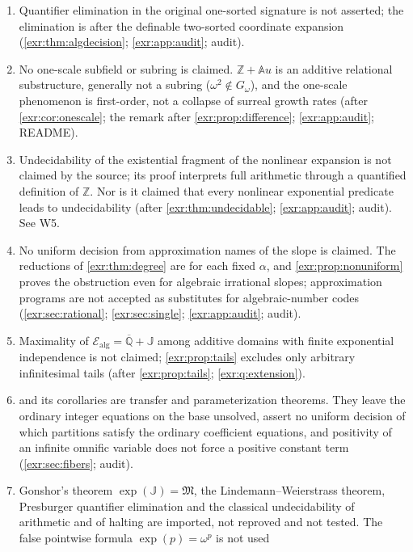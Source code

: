 \documentclass[11pt,letterpaper]{article}
\numberwithin{equation}{section}
\theoremstyle{definition}
\theoremstyle{remark}
\newcommand{\Z}{\mathbb Z}
\newcommand{\A}{\mathbb A}
\newcommand{\Qb}{\overline{\mathbb Q}}
\newcommand{\J}{\mathbb J}
\newcommand{\M}{\mathfrak M}
\newcommand{\Ealg}{\mathcal E_{\mathrm{alg}}}
\begin{document}
\begin{enumerate}[label=S\arabic*.,leftmargin=2.6em,itemsep=2pt]
omnific terms only, and rational slopes do not make division a total function
(after \cref{exr:thm:rational}; \cref{exr:sec:boundaries};
\cref{exr:q:inequality}; \cref{exr:app:audit}; audit).
\item Quantifier elimination in the original one-sorted signature is not
asserted; the elimination is after the definable two-sorted coordinate
expansion (\cref{exr:thm:algdecision}; \cref{exr:app:audit}; audit).
\item No one-scale subfield or subring is claimed. $\Z+\A u$ is an additive
relational substructure, generally not a subring ($\omega^2\notin
G_\omega$), and the one-scale phenomenon is first-order, not a collapse of
surreal growth rates (after \cref{exr:cor:onescale}; the remark after
\cref{exr:prop:difference}; \cref{exr:app:audit}; README).
\item Undecidability of the existential fragment of the nonlinear expansion
is not claimed by the source; its proof interprets full arithmetic through a
quantified definition of $\Z$. Nor is it claimed that every nonlinear
exponential predicate leads to undecidability (after
\cref{exr:thm:undecidable}; \cref{exr:app:audit}; audit). See W5.
\item No uniform decision from approximation names of the slope is claimed.
The reductions of \cref{exr:thm:degree} are for each fixed $\alpha$, and
\cref{exr:prop:nonuniform} proves the obstruction even for algebraic
irrational slopes; approximation programs are not accepted as substitutes for
algebraic-number codes (\cref{exr:sec:rational}; \cref{exr:sec:single};
\cref{exr:app:audit}; audit).
\item Maximality of $\Ealg=\Qb+\J$ among additive domains with finite
exponential independence is not claimed; \cref{exr:prop:tails} excludes only
arbitrary infinitesimal tails (after \cref{exr:prop:tails};
\cref{exr:q:extension}).
\item {} and its corollaries are transfer and
parameterization theorems. They leave the ordinary integer equations on the
base unsolved, assert no uniform decision of which partitions satisfy the
ordinary coefficient equations, and positivity of an infinite omnific
variable does not force a positive constant term (\cref{exr:sec:fibers};
audit).
\item Gonshor's theorem $\exp(\J)=\M$, the Lindemann--Weierstrass theorem,
Presburger quantifier elimination and the classical undecidability of
arithmetic and of halting are imported, not reproved and not tested. The
false pointwise formula $\exp(p)=\omega^p$ is not used

\end{enumerate}
\end{document}
